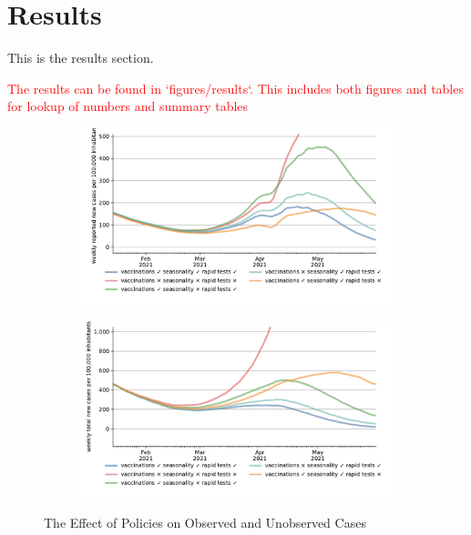 \section{Results}
\label{sec:results}

This is the results section.

\textcolor{red}{The results can be found in `figures/results`. This includes both figures
and tables for lookup of numbers and summary tables}



\begin{figure}[ht]
\centering
\begin{subfigure}{.6\textwidth}
  \includegraphics[width=0.9 \textwidth]{../figures/results/figures/scenario_comparisons/one_off_and_combined/full_new_known_case_cropped}
\end{subfigure}%
\begin{subfigure}{.6\textwidth}
  \includegraphics[width=0.9 \textwidth]{../figures/results/figures/scenario_comparisons/one_off_and_combined/full_newly_infected_cropped}
\end{subfigure}
\caption{The Effect of Policies on Observed and Unobserved Cases}
\label{fig:explain_decline}
\figurenotes{\textcolor{red}{\ldots}}
\end{figure}






